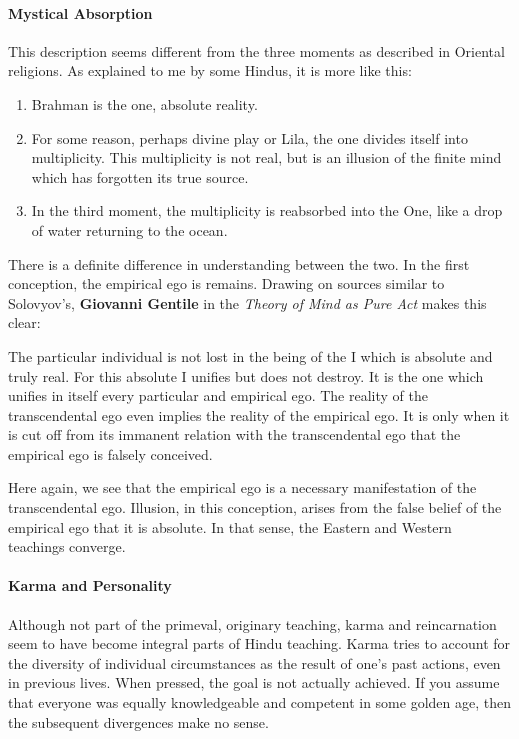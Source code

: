 \paragraph{Mystical Absorption}
This description seems different from the three moments as described in Oriental religions. As explained to me by some Hindus, it is more like this:

\begin{enumerate}
\item Brahman is the one, absolute reality. 
\item For some reason, perhaps divine play or Lila, the one divides itself into multiplicity. This multiplicity is not real, but is an illusion of the finite mind which has forgotten its true source. 
\item In the third moment, the multiplicity is reabsorbed into the One, like a drop of water returning to the ocean. 
\end{enumerate}
There is a definite difference in understanding between the two. In the first conception, the empirical ego is remains. Drawing on sources similar to Solovyov's, \textbf{Giovanni Gentile} in the \textit{Theory of Mind as Pure Act} makes this clear:

\begin{quotex}
The particular individual is not lost in the being of the I which is absolute and truly real. For this absolute I unifies but does not destroy. It is the one which unifies in itself every particular and empirical ego. The reality of the transcendental ego even implies the reality of the empirical ego. It is only when it is cut off from its immanent relation with the transcendental ego that the empirical ego is falsely conceived.

\end{quotex}
Here again, we see that the empirical ego is a necessary manifestation of the transcendental ego. Illusion, in this conception, arises from the false belief of the empirical ego that it is absolute. In that sense, the Eastern and Western teachings converge.

\paragraph{Karma and Personality}
Although not part of the primeval, originary teaching, karma and reincarnation seem to have become integral parts of Hindu teaching. Karma tries to account for the diversity of individual circumstances as the result of one's past actions, even in previous lives. When pressed, the goal is not actually achieved. If you assume that everyone was equally knowledgeable and competent in some golden age, then the subsequent divergences make no sense.

